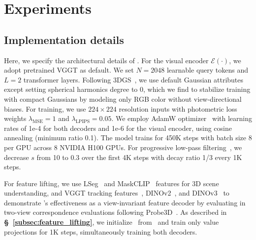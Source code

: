 \section{Experiments}
\label{sec:experiment}

\subsection{Implementation details}
Here, we specify the architectural details of \ours. For the visual encoder $\mathcal{E}(\cdot)$, we adopt pretrained VGGT as default. We set $N=2048$ learnable query tokens and $L=2$ transformer layers. Following 3DGS~\cite{kerbl20233d}, we use default Gaussian attributes except setting spherical harmonics degree to 0, which we find to stabilize training with compact Gaussians by modeling only RGB color without view-directional biases. For training, we use $224 \times 224$ resolution inputs with photometric loss weights $\lambda_\text{MSE}=1$ and $\lambda_\text{LPIPS}=0.05$. We employ AdamW optimizer~\cite{loshchilov2017decoupled} with learning rates of 1e-4 for both decoders and 1e-6 for the visual encoder, using cosine annealing (minimum ratio 0.1). The model trains for 450K steps with batch size 8 per GPU across 8 NVIDIA H100 GPUs. For progressive low-pass filtering~\cite{jung2024relaxing}, we decrease $s$ from 10 to 0.3 over the first 4K steps with decay ratio 1/3 every 1K steps.

For feature lifting, we use LSeg~\cite{li2022language} and MaskCLIP~\cite{zhou2022extract} features for 3D scene understanding, and VGGT tracking features~\cite{wang2025vggt}, DINOv2~\cite{oquab2023dinov2}, and DINOv3~\cite{simeoni2025dinov3} to demonstrate \oursF's effectiveness as a view-invariant feature decoder by evaluating in two-view correspondence evaluations following Probe3D~\cite{el2024probing}. As described in \textbf{\S~\ref{subsec:feature_lifting}}, we initialize \oursF\ from \ours\ and train only value projections for 1K steps, simultaneously training both decoders.



















